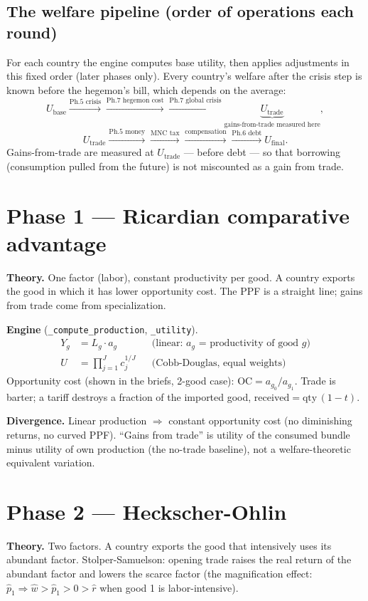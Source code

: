 \documentclass[11pt]{article}
\newcommand{\code}[1]{\texttt{#1}}
\begin{document}
\subsection{The welfare pipeline (order of operations each round)}
For each country the engine computes base utility, then applies adjustments in
this fixed order (later phases only). Every country's welfare after the crisis
step is known before the hegemon's bill, which depends on the average:
\[
U_{\text{base}} \xrightarrow{\text{Ph.5 crisis}} \xrightarrow{\text{Ph.7 hegemon cost}}
\xrightarrow{\text{Ph.7 global crisis}} \underbrace{U_{\text{trade}}}_{\text{gains-from-trade measured here}},
\]
\[
U_{\text{trade}} \xrightarrow{\text{Ph.5 money}} \xrightarrow{\text{MNC tax}} \xrightarrow{\text{compensation}}
\xrightarrow{\text{Ph.6 debt}} U_{\text{final}}.
\]
Gains-from-trade are measured at $U_{\text{trade}}$ --- before debt --- so that
borrowing (consumption pulled from the future) is not miscounted as a gain from
trade.

\section{Phase 1 --- Ricardian comparative advantage}
\textbf{Theory.} One factor (labor), constant productivity per good. A country
exports the good in which it has lower opportunity cost. The PPF is a straight
line; gains from trade come from specialization.

\textbf{Engine} (\code{\_compute\_production}, \code{\_utility}).
\begin{align*}
Y_g &= L_g \cdot a_g && \text{(linear: } a_g \text{ = productivity of good } g\text{)}\\
U &= \prod_{j=1}^{J} c_j^{1/J} && \text{(Cobb-Douglas, equal weights)}
\end{align*}
Opportunity cost (shown in the briefs, 2-good case): $\text{OC} = a_{g_0}/a_{g_1}$.
Trade is barter; a tariff destroys a fraction of the imported good,
$\text{received} = \text{qty}\,(1-t)$.

\textbf{Divergence.} Linear production $\Rightarrow$ constant opportunity cost
(no diminishing returns, no curved PPF). ``Gains from trade'' is utility of the
consumed bundle minus utility of own production (the no-trade baseline), not a
welfare-theoretic equivalent variation.

\section{Phase 2 --- Heckscher-Ohlin}
\textbf{Theory.} Two factors. A country exports the good that intensively uses
its abundant factor. Stolper-Samuelson: opening trade raises the real return of
the abundant factor and lowers the scarce factor (the magnification effect:
$\hat{p}_1 \Rightarrow \hat{w} > \hat{p}_1 > 0 > \hat{r}$ when good 1 is
labor-intensive).
\end{document}
